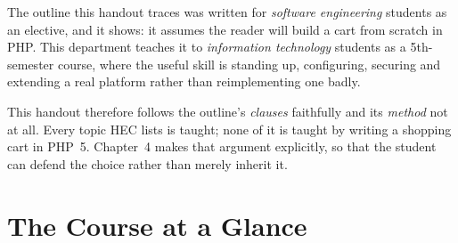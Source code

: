 \begin{alertbox}
The outline this handout traces was written for \emph{software engineering}
students as an elective, and it shows: it assumes the reader will build a cart
from scratch in PHP. This department teaches it to \emph{information technology}
students as a 5th-semester course, where the useful skill is standing up,
configuring, securing and extending a real platform rather than reimplementing
one badly.

\smallskip
This handout therefore follows the outline's \emph{clauses} faithfully and its
\emph{method} not at all. Every topic HEC lists is taught; none of it is taught
by writing a shopping cart in PHP~5. Chapter~4 makes that argument explicitly,
so that the student can defend the choice rather than merely inherit it.
\end{alertbox}

\newpage

\chapter*{The Course at a Glance}

